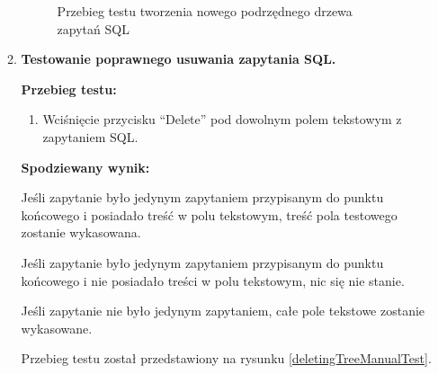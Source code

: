 \begin{enumerate}
\begin{enumerate}
\begin{figure}[h]
                    \caption{Przebieg testu tworzenia nowego podrzędnego drzewa zapytań SQL}
                    \label{creatingNewSubTreeManualTest}
                \end{figure}

                \FloatBarrier

            \item \textbf{Testowanie poprawnego usuwania zapytania SQL.}

                \textbf{Przebieg testu:}

                \begin{enumerate}

                    \item Wciśnięcie przycisku ``Delete'' pod dowolnym polem
                        tekstowym z zapytaniem SQL.

                \end{enumerate}

                \textbf{Spodziewany wynik:}

                Jeśli zapytanie było jedynym zapytaniem przypisanym do punktu
                końcowego i posiadało treść w polu tekstowym, treść pola
                testowego zostanie wykasowana.

                Jeśli zapytanie było jedynym zapytaniem przypisanym do punktu
                końcowego i nie posiadało treści w polu tekstowym, nic się nie
                stanie.

                Jeśli zapytanie nie było jedynym zapytaniem, całe pole tekstowe
                zostanie wykasowane.

                Przebieg testu został przedstawiony na rysunku \ref{deletingTreeManualTest}.

                \begin{figure}[h]
                    \centering


\end{figure}
\end{enumerate}
\end{enumerate}
